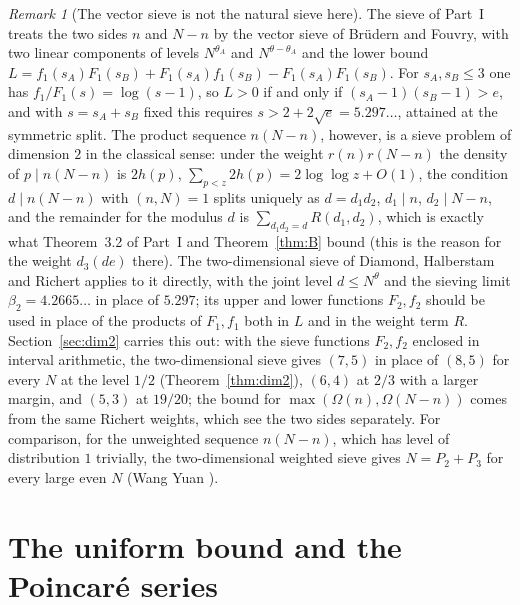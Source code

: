 ﻿\documentclass[11pt]{amsart}
\theoremstyle{remark}
\newtheorem{remark}[theorem]{Remark}
\begin{document}
\begin{remark}[The vector sieve is not the natural sieve here]\label{rem:dim2}
The sieve of Part~I treats the two sides $n$ and $N-n$ by the vector sieve of Br\"udern and Fouvry, with two linear components of levels $N^{\theta_A}$ and $N^{\theta-\theta_A}$ and the lower bound $L=f_1(s_A)F_1(s_B)+F_1(s_A)f_1(s_B)-F_1(s_A)F_1(s_B)$. For $s_A,s_B\le3$ one has $f_1/F_1(s)=\log(s-1)$, so $L>0$ if and only if $(s_A-1)(s_B-1)>e$, and with $s=s_A+s_B$ fixed this requires $s>2+2\sqrt e=5.297\ldots$, attained at the symmetric split. The product sequence $n(N-n)$, however, is a sieve problem of dimension $2$ in the classical sense: under the weight $r(n)r(N-n)$ the density of $p\mid n(N-n)$ is $2h(p)$, $\sum_{p<z}2h(p)=2\log\log z+O(1)$, the condition $d\mid n(N-n)$ with $(n,N)=1$ splits uniquely as $d=d_1d_2$, $d_1\mid n$, $d_2\mid N-n$, and the remainder for the modulus $d$ is $\sum_{d_1d_2=d}R(d_1,d_2)$, which is exactly what Theorem~3.2 of Part~I and Theorem~\ref{thm:B} bound (this is the reason for the weight $d_3(de)$ there). The two-dimensional sieve of Diamond, Halberstam and Richert \cite{DH} applies to it directly, with the joint level $d\le N^{\theta}$ and the sieving limit $\beta_2=4.2665\ldots$ in place of $5.297$; its upper and lower functions $F_2,f_2$ should be used in place of the products of $F_1,f_1$ both in $L$ and in the weight term $R$. Section~\ref{sec:dim2} carries this out: with the sieve functions $F_2,f_2$ enclosed in interval arithmetic, the two-dimensional sieve gives $(7,5)$ in place of $(8,5)$ for every $N$ at the level $1/2$ (Theorem~\ref{thm:dim2}), $(6,4)$ at $2/3$ with a larger margin, and $(5,3)$ at $19/20$; the bound for $\max(\Omega(n),\Omega(N-n))$ comes from the same Richert weights, which see the two sides separately. For comparison, for the unweighted sequence $n(N-n)$, which has level of distribution $1$ trivially, the two-dimensional weighted sieve gives $N=P_2+P_3$ for every large even $N$ (Wang Yuan \cite{Wang}).
\end{remark}

\section{The uniform bound and the Poincar\'e series}\label{sec:spectral}
\end{document}
